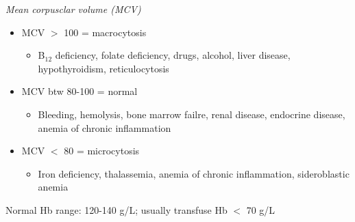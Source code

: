 \documentclass[twocolumn]{article}
\begin{document}
\textit{Mean corpusclar volume (MCV)}
\vspace{-.5em}
\begin{itemize}
    \item MCV $>$ 100 = macrocytosis
    \begin{itemize}
        \item B$_{12}$ deficiency, folate deficiency, drugs, alcohol, liver disease, hypothyroidism, reticulocytosis
    \end{itemize}
    \item MCV btw 80-100 = normal
    \begin{itemize}
        \item Bleeding, hemolysis, bone marrow failre, renal disease, endocrine disease, anemia of chronic inflammation
    \end{itemize}
    \item MCV $<$ 80 = microcytosis
    \begin{itemize}
        \item Iron deficiency, thalassemia, anemia of chronic inflammation, sideroblastic anemia
    \end{itemize}
\end{itemize} \vspace{-.5em}

Normal Hb range: 120-140 g/L; usually transfuse Hb $<$ 70 g/L
\end{document}
